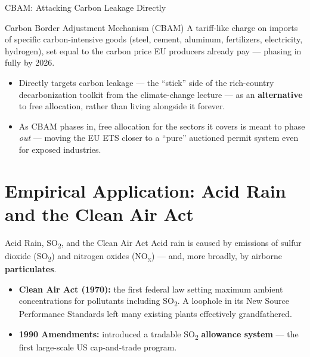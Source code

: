 \documentclass[11pt,aspectratio=169]{beamer}
\begin{document}


\begin{frame}{CBAM: Attacking Carbon Leakage Directly}
	\begin{block}{Carbon Border Adjustment Mechanism (CBAM)}
		A tariff-like charge on imports of specific carbon-intensive goods (steel, cement, aluminum, fertilizers, electricity, hydrogen), set equal to the carbon price EU producers already pay --- phasing in fully by 2026.
	\end{block}
	\begin{itemize}
		\item Directly targets carbon leakage --- the ``stick'' side of the rich-country decarbonization toolkit from the climate-change lecture --- as an \textbf{alternative} to free allocation, rather than living alongside it forever.
		\item As CBAM phases in, free allocation for the sectors it covers is meant to phase \emph{out} --- moving the EU ETS closer to a ``pure'' auctioned permit system even for exposed industries.
	\end{itemize}
\end{frame}




\section{Empirical Application: Acid Rain and the Clean Air Act}

\begin{frame}{Acid Rain, SO\textsubscript{2}, and the Clean Air Act}
  Acid rain is caused by emissions of sulfur dioxide (SO\textsubscript{2}) and nitrogen oxides (NO\textsubscript{x}) --- and, more broadly, by airborne \textbf{particulates}.
  \begin{itemize}
    \item \textbf{Clean Air Act (1970):} the first federal law setting maximum ambient concentrations for pollutants including SO\textsubscript{2}. A loophole in its New Source Performance Standards left many existing plants effectively grandfathered.
    \item \textbf{1990 Amendments:} introduced a tradable SO\textsubscript{2} \textbf{allowance system} --- the first large-scale US cap-and-trade program.
  \end{itemize}
\end{frame}
\end{document}
